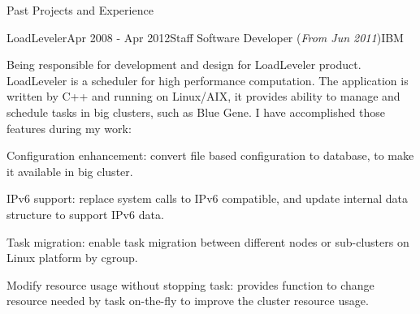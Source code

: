 \documentclass{resume} %
\newcommand{\http}{http:/\hspace{-0.3ex}/}
\begin{document}
\begin{rSection}{Past Projects and Experience}
%
%



\begin{rSubsection}{LoadLeveler}{Apr 2008 - Apr 2012}{Staff Software Developer (\textit{From Jun 2011})}{IBM}

Being responsible for development and design for LoadLeveler product. LoadLeveler is a scheduler for high performance computation. The application is written by C++ and running on Linux/AIX, it provides ability to manage and schedule tasks in big clusters, such as Blue Gene. I have accomplished those features during my work:

\begin{rSubsectionList}
\item Configuration enhancement: convert file based configuration to database, to make it available in big cluster.
\item IPv6 support: replace system calls to IPv6 compatible, and update internal data structure to support IPv6 data.
\item Task migration: enable task migration between different nodes or sub-clusters on Linux platform by cgroup.
\item Modify resource usage without stopping task: provides function to change resource needed by task on-the-fly to improve the cluster resource usage.
\end{rSubsectionList}\vspace{-1.5em}


\end{rSubsection}
\end{rSection}
\end{document}
